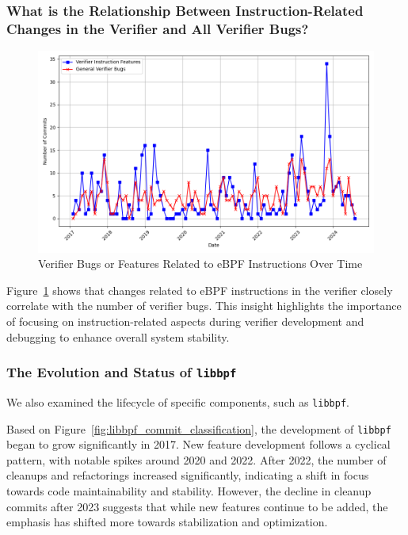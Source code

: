 \subsubsection{What is the Relationship Between Instruction-Related Changes in the Verifier and All Verifier Bugs?}

\begin{figure}[ht]
    \centering
    \includegraphics[width=\linewidth]{feature-analysis/verifier_features_vs_general_bugs_over_time.png}
    \caption{Verifier Bugs or Features Related to eBPF Instructions Over Time}
    \label{fig:instruction_verifier_features_bugs_over_time}
\end{figure}

Figure~\ref{fig:instruction_verifier_features_bugs_over_time} shows that changes related to eBPF instructions in the verifier closely correlate with the number of verifier bugs. This insight highlights the importance of focusing on instruction-related aspects during verifier development and debugging to enhance overall system stability.

\subsubsection{The Evolution and Status of \texttt{libbpf}}

We also examined the lifecycle of specific components, such as \texttt{libbpf}.

Based on Figure~\ref{fig:libbpf_commit_classification}, the development of \texttt{libbpf} began to grow significantly in 2017. New feature development follows a cyclical pattern, with notable spikes around 2020 and 2022. After 2022, the number of cleanups and refactorings increased significantly, indicating a shift in focus towards code maintainability and stability. However, the decline in cleanup commits after 2023 suggests that while new features continue to be added, the emphasis has shifted more towards stabilization and optimization.

